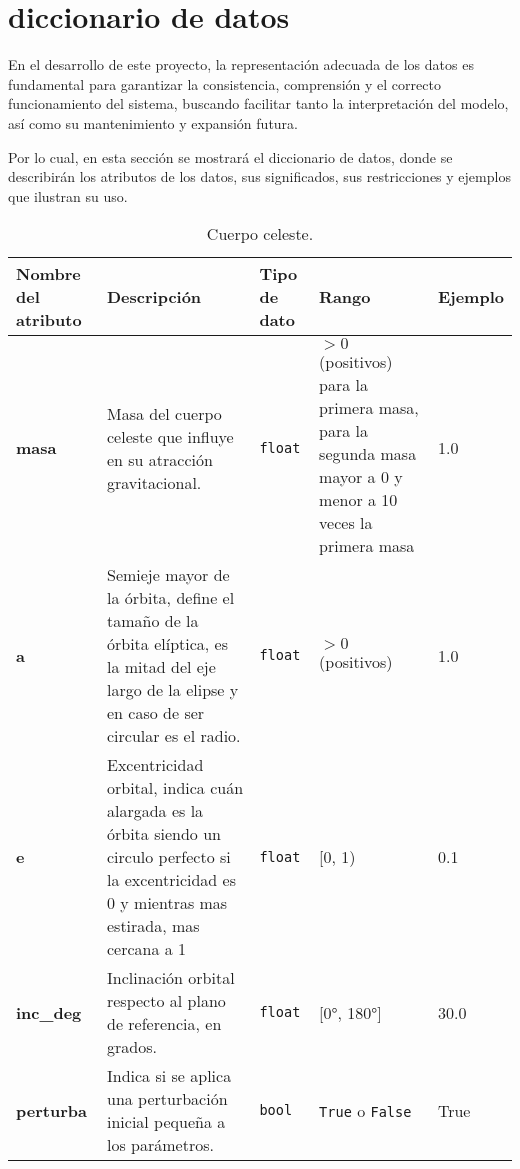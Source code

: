 \section{diccionario de datos}

En el desarrollo de este proyecto, la representación adecuada de los datos es fundamental para garantizar la consistencia, comprensión y el correcto funcionamiento del sistema, buscando facilitar tanto la interpretación del modelo, así como su mantenimiento y expansión futura.

Por lo cual, en esta sección se mostrará el diccionario de datos, donde se describirán los atributos de los datos, sus significados, sus restricciones y ejemplos que ilustran su uso.

\begin{table}[H]
    \centering
    \caption{Cuerpo celeste.}
    \label{tab:diccionario_cuerpos}
    \begin{adjustbox}{max width=\textwidth}
        \begin{tabular}{@{}p{4cm} p{5cm} p{2cm} p{2cm} p{3cm}@{}}
            \toprule
            \textbf{Nombre del atributo} & \textbf{Descripción} & \textbf{Tipo de dato} & \textbf{Rango} & \textbf{Ejemplo} \\
            \midrule
            \textbf{masa} & Masa del cuerpo celeste que influye en su atracción gravitacional. & \texttt{float} & \(>0\) (positivos) para la primera masa, para la segunda masa mayor a 0 y menor a 10 veces la primera masa& 1.0 \\
            \midrule
            \textbf{a} & Semieje mayor de la órbita, define el tamaño de la órbita elíptica, es la mitad del eje largo de la elipse y en caso de ser circular es el radio. & \texttt{float} & \(>0\) (positivos) & 1.0 \\
            \midrule
            \textbf{e} & Excentricidad orbital, indica cuán alargada es la órbita siendo un circulo perfecto si la excentricidad es 0 y mientras mas estirada, mas cercana a 1 & \texttt{float} & [0, 1) & 0.1 \\
            \midrule
            \textbf{inc\_deg} & Inclinación orbital respecto al plano de referencia, en grados. & \texttt{float} & [0°, 180°] & 30.0 \\
            \midrule
            \textbf{perturba} & Indica si se aplica una perturbación inicial pequeña a los parámetros. & \texttt{bool} & \texttt{True} o \texttt{False} & True \\
            \bottomrule
        \end{tabular}
    \end{adjustbox}
\end{table}

